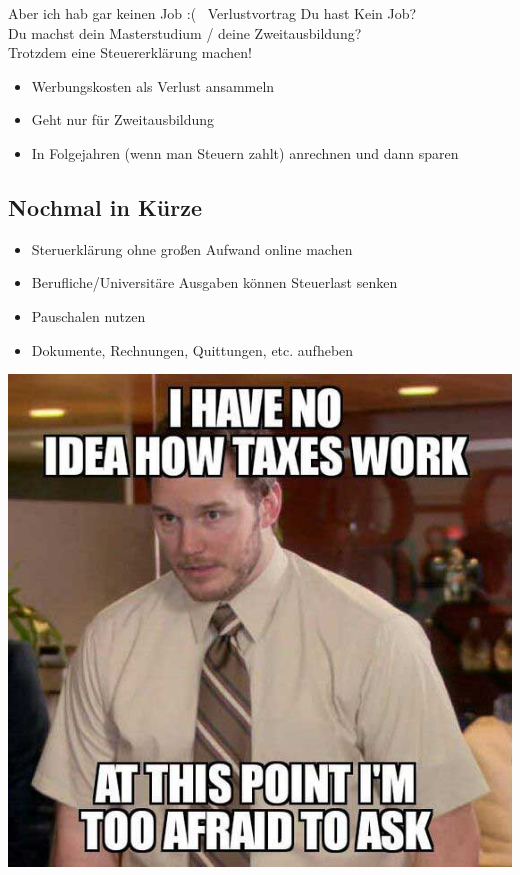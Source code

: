 \documentclass{beamer}
\newcommand{\n}{\hfill\\\vspace{0.25cm}}
\begin{document}
			\begin{frame}{Aber ich hab gar keinen Job :( \textrightarrow\ Verlustvortrag}
				Du hast Kein Job?\\\pause
				Du machst dein Masterstudium / deine Zweitausbildung?\\\pause
				Trotzdem eine Steuererklärung machen!\n\pause
				\begin{itemize}
					\item Werbungskosten als Verlust ansammeln
					\item Geht nur für Zweitausbildung
					\item In Folgejahren (wenn man Steuern zahlt) anrechnen und dann sparen
				\end{itemize}
			\end{frame}
		
		\subsection{Nochmal in Kürze}
		
			\begin{frame}
				\begin{itemize}
					\item Steruerklärung ohne großen Aufwand online machen
					\item Berufliche/Universitäre Ausgaben können Steuerlast senken
					\item Pauschalen nutzen
					\item Dokumente, Rechnungen, Quittungen, etc. aufheben
				\end{itemize}
			\end{frame}
	
		{
		\begin{frame}[plain]
			\begin{center}
				\includegraphics[height=\textheight]{images/too-afraid-to-ask.jpg}
			\end{center}
		\end{frame}
		}
\end{document}
